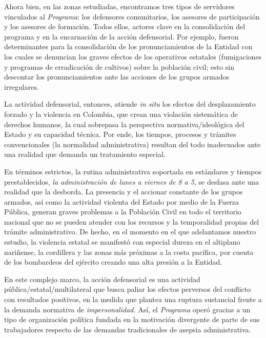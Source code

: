 \documentclass[
  spanish,
  11pt,
  a4paper,
]{scrbook}
\begin{document}
Ahora bien, en las zonas estudiadas, encontramos tres tipos de
servidores vinculados al \emph{Programa}: los defensores comunitarios,
los asesores de participación y los asesores de formación. Todos ellos,
actores clave en la consolidación del programa y en la encarnación de la
acción defensorial. Por ejemplo, fueron determinantes para la
consolidación de los pronunciamientos de la Entidad con los cuales se
denuncian los graves efectos de los operativos estatales (fumigaciones y
programas de erradicación de cultivos) sobre la población civil; esto
sin descontar los pronunciamientos ante las acciones de los grupos
armados irregulares.

La actividad defensorial, entonces, atiende \emph{in situ} los efectos
del desplazamiento forzado y la violencia en Colombia, que crean una
violación sistemática de derechos humanos, la cual sobrepasa la
perspectiva normativa/ideológica del Estado y su capacidad técnica. Por
ende, los tiempos, procesos y trámites convencionales (la normalidad
administrativa) resultan del todo inadecuados ante una realidad que
demanda un tratamiento especial.

En términos estrictos, la rutina administrativa soportada en estándares
y tiempos prestablecidos, \emph{la administración de lunes a viernes de
8 a 5}, se desfasa ante una realidad que la desborda. La presencia y el
accionar constante de los grupos armados, así como la actividad violenta
del Estado por medio de la Fuerza Pública, generan graves problemas a la
Población Civil en todo el territorio nacional que no se pueden atender
con los recursos y la temporalidad propias del trámite administrativo.
De hecho, en el momento en el que adelantamos nuestro estudio, la
violencia estatal se manifestó con especial dureza en el altiplano
nariñense, la cordillera y las zonas más próximas a la costa pacífica,
por cuenta de los bombardeos del ejército creando una alta presión a la
Entidad.

En este complejo marco, la acción defensorial es una actividad
pública/estatal/multilateral que busca paliar los efectos perversos del
conflicto con resultados positivos, en la medida que plantea una ruptura
sustancial frente a la demanda normativa de \emph{impersonalidad.} Así,
el \emph{Programa} operó gracias a un tipo de organización política
fundada en la motivación divergente de parte de sus trabajadores
respecto de las demandas tradicionales de asepsia administrativa.
\end{document}
